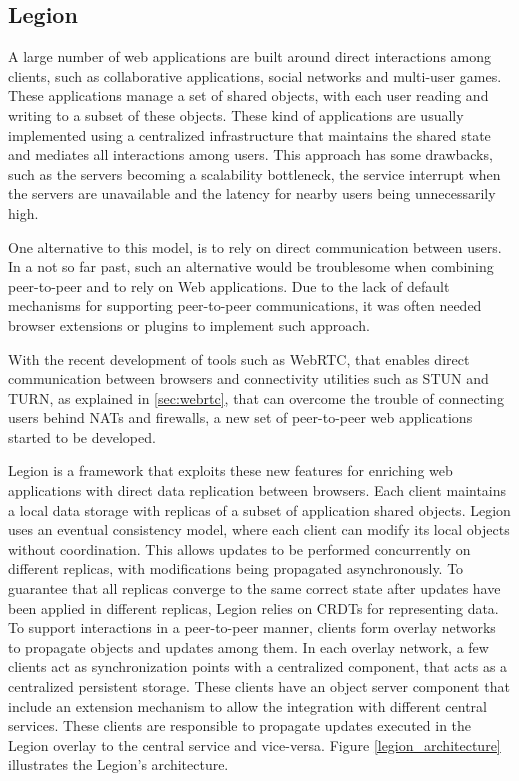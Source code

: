 \subsection{Legion}
\label{sec:legion_intro}
A large number of web applications are built around direct interactions among clients, such as collaborative applications, social networks and multi-user games. These applications manage a set of shared objects, with each user reading and writing to a subset of these objects. These kind of applications are usually implemented using a centralized infrastructure that maintains the shared state and mediates all interactions among users. This approach has some drawbacks, such as the servers becoming a scalability bottleneck, the service interrupt when the servers are unavailable and the latency for nearby users being unnecessarily high.\par
	One alternative to this model, is to rely on direct communication between users. In a not so far past, such an alternative would be troublesome when combining peer-to-peer and to rely on Web applications. Due to the lack of default mechanisms for supporting peer-to-peer communications, it was often needed browser extensions or plugins to implement such approach.\par
	With the recent development of tools such as WebRTC\cite{webrtc}, that enables direct communication between browsers and connectivity utilities such as STUN and TURN, as explained in \ref{sec:webrtc}, that can overcome the trouble of connecting users behind NATs and firewalls, a new set of peer-to-peer web applications started to be developed.\par
	Legion is a framework that exploits these new features for enriching web applications with direct data replication between browsers. Each client maintains a local data storage with replicas of a subset of application shared objects. Legion uses an eventual consistency model, where each client can modify its local objects without coordination. This allows updates to be performed concurrently on different replicas, with modifications being propagated asynchronously. To guarantee that all replicas converge to the same correct state after updates have been applied in different replicas, Legion relies on CRDTs\cite{crdt} for representing data. To support interactions in a peer-to-peer manner, clients form overlay networks to propagate objects and updates among them. In each overlay network, a few clients act as synchronization points with a centralized component, that acts as a centralized persistent storage. These clients have an object server component that include an extension mechanism to allow the integration with different central services. These clients are responsible to propagate updates executed in the Legion overlay to the central service and vice-versa. Figure \ref{legion_architecture} illustrates the Legion's architecture.
	

